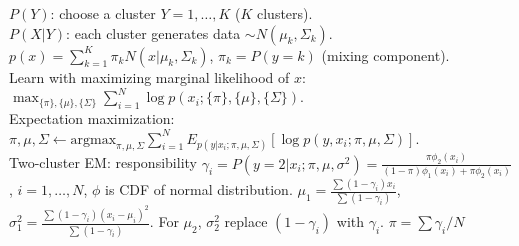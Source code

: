 $P(Y)$: choose a cluster $Y=1, \dots, K$ ($K$ clusters).\\
$P(X|Y)$: each cluster generates data $\sim N(\mu_k, \Sigma_k)$.\\
$p(x) = \sum_{k=1}^K \pi_k N(x|\mu_k, \Sigma_k)$, $\pi_k=P(y=k)$ (mixing component).\\
Learn with maximizing marginal likelihood of $x$: $\max_{\{\pi\}, \{\mu\}, \{\Sigma\}}\sum_{i=1}^N\log p(x_i; \{\pi\},\{\mu\},\{\Sigma\})$.\\
Expectation maximization: $\pi, \mu, \Sigma \leftarrow \text{argmax}_{\pi, \mu, \Sigma}\sum_{i=1}^N E_{p(y|x_i;\pi,\mu,\Sigma)}[\log p(y,x_i;\pi,\mu,\Sigma)]$.\\
Two-cluster EM: responsibility $\gamma_i = P(y=2|x_i;\pi,\mu,\sigma^2) =  \frac{\pi\phi_2(x_i)}{(1-\pi)\phi_1(x_i)+\pi\phi_2(x_i)}$, $i=1, \dots, N$, $\phi$ is CDF of normal distribution. $\mu_1=\frac{\sum(1-\gamma_i)x_i}{\sum(1-\gamma_i)}$, $\sigma_1^2=\frac{\sum(1-\gamma_i)(x_i-\mu_i)^2}{\sum(1-\gamma_i)}$. For $\mu_2$, $\sigma_2^2$ replace $(1-\gamma_i)$ with $\gamma_i$. $\pi = \sum \gamma_i/N$